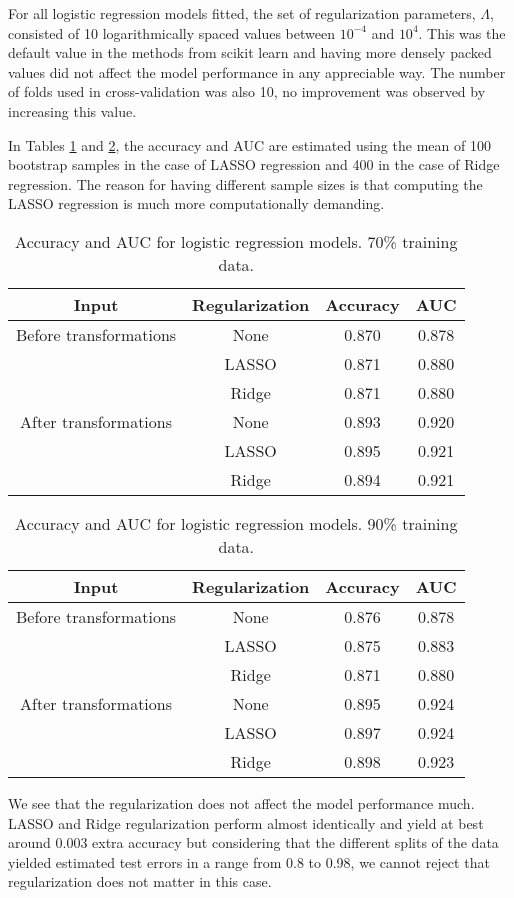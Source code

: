 \documentclass[../../project.tex]{subfiles}
\begin{document}
	For all logistic regression models fitted, the set of regularization parameters, $\Lambda$, consisted of 10 logarithmically spaced values between $10^{-4}$ and $10^4$. This was the default value in the methods from scikit learn and having more densely packed values did not affect the model performance in any appreciable way. The number of folds used in cross-validation was also 10, no improvement was observed by increasing this value.
	
	In Tables \ref{tab:logreg_table_70} and \ref{tab:logreg_table_90}, the accuracy and AUC are estimated using the mean of 100 bootstrap samples in the case of LASSO regression and 400 in the case of Ridge regression. The reason for having different sample sizes is that computing the LASSO regression is much more computationally demanding.
	
	\begin{table}[h!]
		\centering
		\caption{Accuracy and AUC for logistic regression models. 70\% training data.}
		\begin{tabular}{cccc}
		    \toprule
			Input & Regularization & Accuracy & AUC \\
			\midrule
			Before transformations & None & 0.870 & 0.878 \\
			& LASSO & 0.871 & 0.880 \\
			& Ridge & 0.871 & 0.880 \\
			\midrule
			After transformations & None & 0.893 & 0.920 \\
			& LASSO & 0.895 & 0.921 \\
			& Ridge & 0.894 & 0.921 \\
			\bottomrule
		\end{tabular}
		\label{tab:logreg_table_70}
	\end{table}
	
	\begin{table}[h!]
		\centering
		\caption{Accuracy and AUC for logistic regression models. 90\% training data.}
		\begin{tabular}{cccc}
		    \toprule
			Input & Regularization & Accuracy & AUC \\
			\midrule
			Before transformations & None & 0.876 & 0.878 \\
			& LASSO & 0.875 & 0.883 \\
			& Ridge & 0.871 & 0.880 \\
			\midrule
			After transformations & None & 0.895 & 0.924 \\
			& LASSO & 0.897 & 0.924 \\
			& Ridge & 0.898 & 0.923 \\
			\bottomrule
		\end{tabular}
		\label{tab:logreg_table_90}
	\end{table}
	
	We see that the regularization does not affect the model performance much. LASSO and Ridge regularization perform almost identically and yield at best around 0.003 extra accuracy but considering that the different splits of the data yielded estimated test errors in a range from 0.8 to 0.98, we cannot reject that regularization does not matter in this case.
\end{document}
